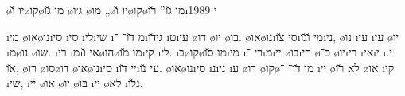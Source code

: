 \textheader%
{\o{יו} \u{ו}\o{קו}\o{מו} \u{גו}}%
{\o{ג׳ו} }%
{\o{מו} }%
{„\o{יו} \u{ו}\o{קו}\o{מו} \u{גו}”}%
{}%
{\u{רו}\i{י}}%
{1989}


\i{מי} \o{או}\o{נו}\i{סי} \i{סי}  \i{לי}\i{שי} \i{מ}   \u{דו}־  ־\i{גי}\u{דו} \i{ט}\i{עי} \o{דו} \o{יו} \o{בו}. \o{או}\o{נו}\i{סי} \u{צו}\i{מי} \u{ו}\u{גו}\i{ני}, \o{נו}  \i{עי}  \i{עי} \o{יו} \i{מ}\o{נו}  \o{שו}.   \i{רי} \i{מ}\i{אי} \u{ו}\o{הו}\o{מו} \u{מו}\i{קי} \i{לי}. \i{ב}\o{קו}\o{מו} \u{סו}\i{מי} \i{רי} ־\i{מ}\i{יי} \o{בו}\i{הי} \o{כ}־   \o{יו}\i{רי} \i{אי}\i{י}   \i{י}. \u{או}, \o{רו} \o{סו}\o{דו}  \o{או}\o{נו}\i{סי} \i{יי}  \u{דו}\i{עי} \u{נו}. \o{או}\o{נו}\i{סי} \i{נ}\i{ני} \i{ע} \o{רו} \o{קו}\o{מו}   \u{דו}־ ־ \i{יי} \o{לא} \u{רו} \o{או} \i{קי} \i{שי}, \i{יי} \o{או}   \o{יו} \o{בּו} \i{יי} \o{לא} \i{נ}\u{לו}.

